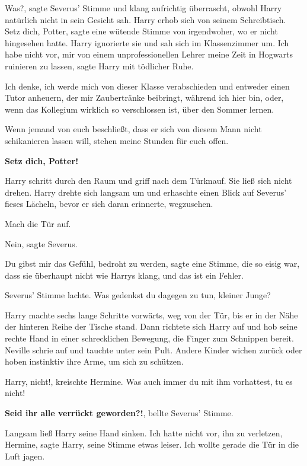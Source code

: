 \glqq Was?\grqq{}, sagte Severus' Stimme und klang aufrichtig überrascht, obwohl
Harry natürlich nicht in sein Gesicht sah. Harry erhob sich von seinem
Schreibtisch. \glqq Setz dich, Potter\grqq{}, sagte eine wütende Stimme von
irgendwoher, wo er nicht hingesehen hatte. Harry ignorierte sie und sah sich im
Klassenzimmer um. \glqq Ich habe nicht vor, mir von einem unprofessionellen
Lehrer meine Zeit in Hogwarts ruinieren zu lassen\grqq{}, sagte Harry mit
tödlicher Ruhe.

\glqq Ich denke, ich werde mich von dieser Klasse verabschieden und entweder
einen Tutor anheuern, der mir Zaubertränke beibringt, während ich hier bin,
oder, wenn das Kollegium wirklich so verschlossen ist, über den Sommer lernen.

Wenn jemand von euch beschließt, dass er sich von diesem Mann nicht schikanieren
lassen will, stehen meine Stunden für euch offen.\grqq{}

\textbf{\glqq Setz dich, Potter!\grqq{} }

Harry schritt durch den Raum und griff nach dem Türknauf. Sie ließ sich nicht
drehen. Harry drehte sich langsam um und erhaschte einen Blick auf Severus'
fieses Lächeln, bevor er sich daran erinnerte, wegzusehen.

\glqq Mach die Tür auf.\grqq{}

\glqq Nein\grqq{}, sagte Severus.

\glqq Du gibst mir das Gefühl, bedroht zu werden\grqq{}, sagte eine Stimme, die
so eisig war, dass sie überhaupt nicht wie Harrys klang, \glqq und das ist ein
Fehler.\grqq{}

Severus' Stimme lachte. \glqq Was gedenkst du dagegen zu tun, kleiner
Junge?\grqq{}

Harry machte sechs lange Schritte vorwärts, weg von der Tür, bis er in der Nähe
der hinteren Reihe der Tische stand. Dann richtete sich Harry auf und hob seine
rechte Hand in einer schrecklichen Bewegung, die Finger zum Schnippen bereit.
Neville schrie auf und tauchte unter sein Pult. Andere Kinder wichen zurück oder
hoben instinktiv ihre Arme, um sich zu schützen.

\glqq Harry, nicht!\grqq{}, kreischte Hermine. \glqq Was auch immer du mit ihm
vorhattest, tu es nicht!\grqq{}

\glqq \textbf{Seid ihr alle verrückt geworden?!}\grqq{}, bellte Severus' Stimme.

Langsam ließ Harry seine Hand sinken. \glqq Ich hatte nicht vor, ihn zu
verletzen, Hermine\grqq{}, sagte Harry, seine Stimme etwas leiser. \glqq Ich
wollte gerade die Tür in die Luft jagen.\grqq{}

